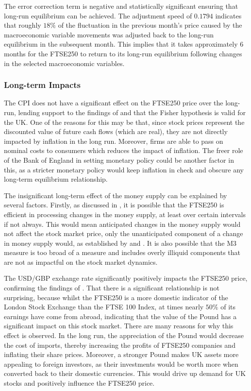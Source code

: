 \documentclass[11pt,a4paper]{article}
\newcommand{\citeboth}[1]{\citeauthor{#1} \citep{#1}}
\begin{document}
The error correction term 
is negative and statistically significant ensuring that long-run equilibrium 
can be achieved. The adjustment speed of $0.1794$ indicates that 
roughly $18\%$ of the fluctuation in the previous month's price caused by the 
macroeconomic variable movements was adjusted back to the long-run equilibrium in the subsequent month. This implies 
that it takes approximately 6 months for the FTSE250 to return to its long-run equilibrium following 
changes in the selected macroeconomic variables.

\subsubsection{Long-term Impacts}

The CPI does not have a significant effect on the FTSE250 price over the 
long-run, lending support to the findings of 
\citeboth{gultekin1983} and \citeboth{firth1979}
that the Fisher hypothesis is valid for the UK. One of the 
reasons for this may be that, since stock prices represent the 
discounted value of future cash flows (which are real), 
they are not directly impacted by inflation in the long run. Moreover, 
firms are able to pass on nominal costs to consumers which reduces
the impact of inflation.
The freer role of the Bank of England in setting monetary policy could be 
another factor in this, as a stricter monetary policy would keep inflation
in check and obscure any long-term equilibrium relationship. 

The insignificant long-term effect of the money supply can be explained by several factors.
Firstly, as discussed in \citeboth{sellin2001}, it is possible that the FTSE250 is efficient in processing changes in the 
money supply, at least over certain intervals if not always. This would mean anticipated changes in the money supply would not affect the stock market price, only the
unanticipated component of a change in money supply would, as established by \citeboth{sorensen1982} and \citeboth{bernanke2005}. 
It is also possible that the M3 measure is too broad of a measure and includes overly illiquid components that are not as impactful 
on the stock market dynamics. 

The USD/GBP exchange rate significantly positively impacts the FTSE250 price, confirming the findings of 
\citeboth{wong2022}. That there is a significant relationship is not surprising, because whilst the FTSE250 is a more domestic indicator of the London Stock Exchange than the FTSE 100 Index, 
at times nearly $50\%$ of its earnings have come from abroad, indicating that 
the value of the Pound has a significant impact on this stock market. There are many reasons for why this effect is observed.
In the long run, the appreciation of the Pound would decrease the 
cost of imports, thereby increasing the 
profits of FTSE250 companies and inflating their share prices.
Moreover, a stronger Pound makes UK assets more appealing to foreign investors, as their investments would be worth more when converted back to their domestic currencies.
This would drive up demand for UK stocks and positively influence the 
FTSE250 price.
\end{document}
